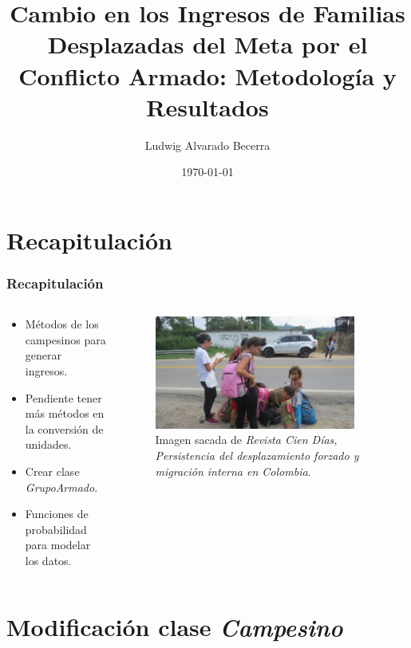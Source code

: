 \documentclass[17pt, t, lualatex]{beamer}
\title{\LARGE Cambio en los Ingresos de Familias Desplazadas del Meta por el Conflicto Armado: Metodología y Resultados}
\date{\today}
\institute[UJTL]{Universidad Jorge Tadeo Lozano}
\author{Ludwig Alvarado Becerra}
\begin{document}
\inserttitlepage

\section{Recapitulación}

\insertsectionpage


\begin{frame}
  \frametitle{Recapitulación} 

\begin{columns}
  \begin{column}{.5\textwidth}
    \begin{itemize}
      \item Métodos de los campesinos para generar ingresos.
      \item Pendiente tener más métodos en la conversión de unidades.
      \item Crear clase \textit{GrupoArmado}.
      \item Funciones de probabilidad para modelar los datos.
    \end{itemize}
  \end{column}

  \begin{column}{.5\textwidth}
    \begin{figure}[ht]
      \centering
      \includegraphics[width = 0.9\textwidth]{img/img1.jpg}
      \caption{Imagen sacada de \textit{Revista Cien Días, Persistencia del desplazamiento forzado y migración interna en Colombia}\cite{Leal2022Desplazamiento}.}
    \end{figure}

  \end{column}
\end{columns}


\end{frame}

\section{Modificación clase \textit{Campesino}}
\end{document}
